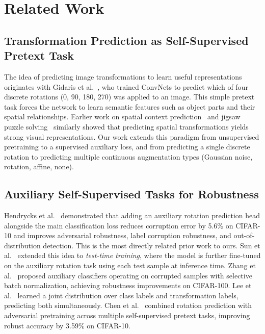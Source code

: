 \documentclass[11pt,a4paper]{article}
\begin{document}
\section{Related Work}

\subsection{Transformation Prediction as Self-Supervised Pretext Task}

The idea of predicting image transformations to learn useful representations originates with Gidaris et al.~\cite{gidaris2018rotnet}, who trained ConvNets to predict which of four discrete rotations (0\textdegree, 90\textdegree, 180\textdegree, 270\textdegree) was applied to an image. This simple pretext task forces the network to learn semantic features such as object parts and their spatial relationships. Earlier work on spatial context prediction~\cite{doersch2015context} and jigsaw puzzle solving~\cite{noroozi2016jigsaw} similarly showed that predicting spatial transformations yields strong visual representations. Our work extends this paradigm from unsupervised pretraining to a supervised auxiliary loss, and from predicting a single discrete rotation to predicting multiple continuous augmentation types (Gaussian noise, rotation, affine, none).

\subsection{Auxiliary Self-Supervised Tasks for Robustness}

Hendrycks et al.~\cite{hendrycks2019selfsupervised} demonstrated that adding an auxiliary rotation prediction head alongside the main classification loss reduces corruption error by 5.6\% on CIFAR-10 and improves adversarial robustness, label corruption robustness, and out-of-distribution detection. This is the most directly related prior work to ours. Sun et al.~\cite{sun2020ttt} extended this idea to \emph{test-time training}, where the model is further fine-tuned on the auxiliary rotation task using each test sample at inference time. Zhang et al.~\cite{zhang2020auxiliary} proposed auxiliary classifiers operating on corrupted samples with selective batch normalization, achieving robustness improvements on CIFAR-100. Lee et al.~\cite{lee2020sla} learned a joint distribution over class labels and transformation labels, predicting both simultaneously. Chen et al.~\cite{chen2020advssl} combined rotation prediction with adversarial pretraining across multiple self-supervised pretext tasks, improving robust accuracy by 3.59\% on CIFAR-10.
\end{document}
